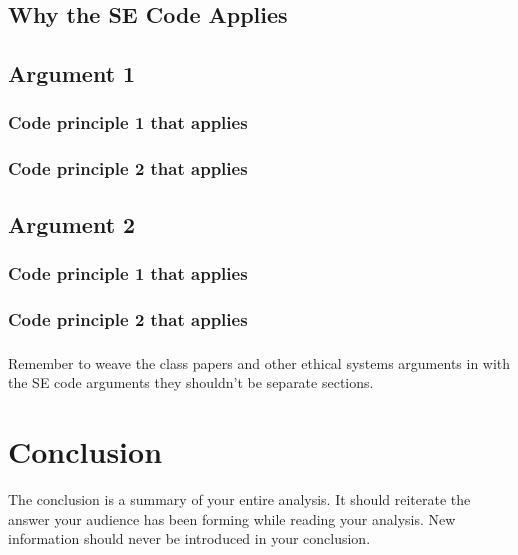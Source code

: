 \documentclass[11pt]{article}
\begin{document}
\begin{multicols}{2}
\subsection{Why the SE Code Applies}
\subsection{Argument 1}
\subsubsection{Code principle 1 that applies}
\subsubsection{Code principle 2 that applies}
\subsection{Argument 2}
\subsubsection{Code principle 1 that applies}
\subsubsection{Code principle 2 that applies}

\subsubsection*{}
Remember to weave the class papers and other ethical systems arguments in with the SE code arguments they shouldn't be separate sections.

\section{Conclusion}
The conclusion is a summary of your entire analysis. It should reiterate the answer your audience has been forming while reading your analysis. New information should never be introduced in your conclusion. \cite{texTemp}

\end{multicols}
\newpage

\nocite{*}




\end{document}
